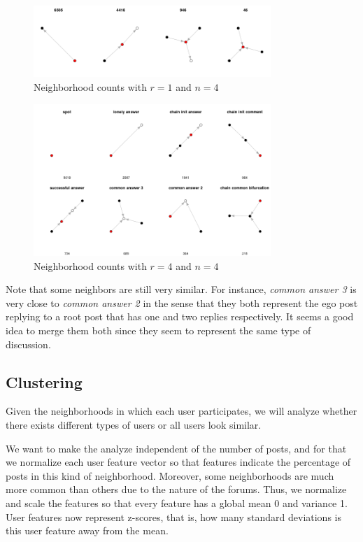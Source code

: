 \documentclass[smallextended]{svjour3}          %
\begin{document}
\begin{figure}
	\centering
	\includegraphics[width=0.8\textwidth]{neighborhoods_1_4}
	\caption{Neighborhood counts with $r=1$ and $n=4$}
	\label{fig:neighborhoods_1_4}
\end{figure}

\begin{figure}
	\centering
	\includegraphics[width=0.8\textwidth]{neighborhoods_4_4}
	\caption{Neighborhood counts with $r=4$ and $n=4$}
	\label{fig:neighborhoods_4_4}
\end{figure}

Note that some neighbors are still very similar. For instance, \textit{common answer 3} is very close to \textit{common answer 2} in the sense that they both represent the ego post replying to a root post that has one and two replies respectively. It seems a good idea to merge them both since they seem to represent the same type of discussion.

\subsection{Clustering}

Given the neighborhoods in which each user participates, we will analyze whether there exists different types of users or all users look similar.

We want to make the analyze independent of the number of posts, and for that we normalize each user feature vector so that features indicate the percentage of posts in this kind of neighborhood. Moreover, some neighborhoods are much more common than others due to the nature of the forums. Thus, we normalize and scale the features so that every feature has a global mean 0 and variance 1. User features now represent z-scores, that is, how many standard deviations is this user feature away from the mean.
\end{document}
